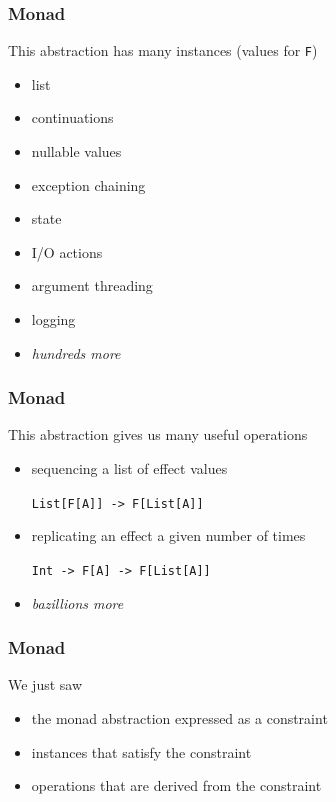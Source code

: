 \begin{frame}[fragile]
\frametitle{Monad}
\begin{block}{This abstraction has many instances (values for \lstinline$F$)}
\begin{itemize}
  \item list
  \item continuations
  \item nullable values
  \item exception chaining
  \item state
  \item I/O actions
  \item argument threading
  \item logging
  \item \emph{hundreds more}
\end{itemize}
\end{block}
\end{frame}


\begin{frame}
\frametitle{Monad}
\begin{block}{This abstraction gives us many useful operations}
\begin{itemize}
  \item sequencing a list of effect values

        \lstinline$List[F[A]] -> F[List[A]]$
  \item replicating an effect a given number of times

        \lstinline$Int -> F[A] -> F[List[A]]$
  \item \emph{bazillions more}
\end{itemize}
\end{block}
\end{frame}


\begin{frame}
\frametitle{Monad}
\begin{block}{We just saw}
\begin{itemize}
  \item<1> the monad abstraction expressed as a constraint
  \item<2> instances that satisfy the constraint
  \item<3> operations that are derived from the constraint
\end{itemize}
\end{block}
\end{frame}


